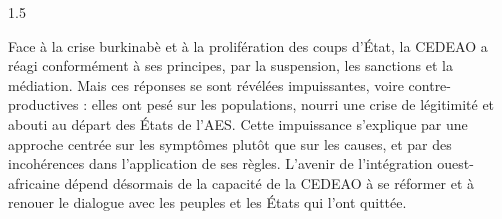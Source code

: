 \documentclass[12pt]{article}
\begin{document}
\begin{spacing}{1.5}

Face à la crise burkinabè et à la prolifération des coups d'État, la CEDEAO a réagi conformément à ses principes, par la suspension, les sanctions et la médiation. Mais ces réponses se sont révélées impuissantes, voire contre-productives : elles ont pesé sur les populations, nourri une crise de légitimité et abouti au départ des États de l'AES. Cette impuissance s'explique par une approche centrée sur les symptômes plutôt que sur les causes, et par des incohérences dans l'application de ses règles. L'avenir de l'intégration ouest-africaine dépend désormais de la capacité de la CEDEAO à se réformer et à renouer le dialogue avec les peuples et les États qui l'ont quittée.

\end{spacing}
\end{document}
